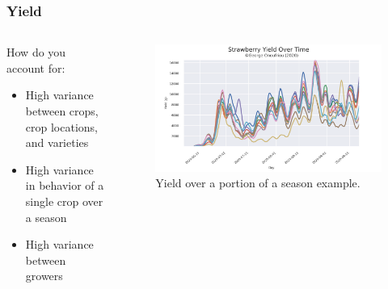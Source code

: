 \documentclass[aspectratio=169]{beamer}
\begin{document}
  \begin{frame}
    \frametitle{Yield}
    \begin{columns}
      \begin{column}{0.3\textwidth}
        How do you account for:
        \begin{itemize}
          \item High variance between crops, crop locations, and varieties
          \item High variance in behavior of a single crop over a season
          \item High variance between growers
        \end{itemize}
      \end{column}
      \begin{column}{0.7\textwidth}
        \begin{figure}[th!]
          \centering
          \includegraphics[width=1\textwidth]{yield.png}
          \caption{Yield over a portion of a season example. \autocite{repository}}
          \label{fig:yield}
        \end{figure}
      \end{column}
    \end{columns}
  \end{frame}
\end{document}

